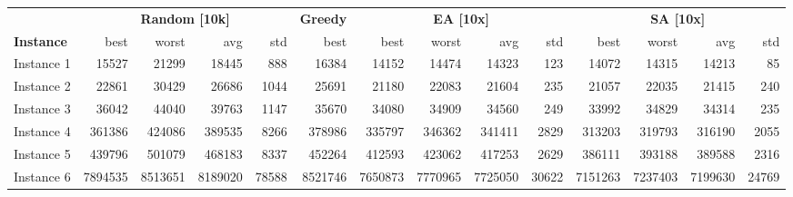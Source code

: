 \begin{tabular}{lrrrrrrrrrrrrr}
\toprule
 & \multicolumn{4}{c}{\textbf{Random [10k]}} & \textbf{Greedy} & \multicolumn{4}{c}{\textbf{EA [10x]}} & \multicolumn{4}{c}{\textbf{SA [10x]}} \\
\cmidrule(lr){2-5} \cmidrule(lr){7-10} \cmidrule(lr){11-14}
\textbf{Instance} & best & worst & avg & std & best & best & worst & avg & std & best & worst & avg & std \\
\midrule
Instance 1 & 15527 & 21299 & 18445 & 888 & 16384 & 14152 & 14474 & 14323 & 123 & 14072 & 14315 & 14213 & 85 \\
Instance 2 & 22861 & 30429 & 26686 & 1044 & 25691 & 21180 & 22083 & 21604 & 235 & 21057 & 22035 & 21415 & 240 \\
Instance 3 & 36042 & 44040 & 39763 & 1147 & 35670 & 34080 & 34909 & 34560 & 249 & 33992 & 34829 & 34314 & 235 \\
Instance 4 & 361386 & 424086 & 389535 & 8266 & 378986 & 335797 & 346362 & 341411 & 2829 & 313203 & 319793 & 316190 & 2055 \\
Instance 5 & 439796 & 501079 & 468183 & 8337 & 452264 & 412593 & 423062 & 417253 & 2629 & 386111 & 393188 & 389588 & 2316 \\
Instance 6 & 7894535 & 8513651 & 8189020 & 78588 & 8521746 & 7650873 & 7770965 & 7725050 & 30622 & 7151263 & 7237403 & 7199630 & 24769 \\
\bottomrule
\end{tabular}
